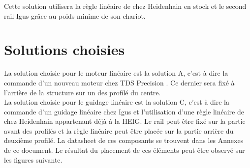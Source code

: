\begin{table}[H]
  \centering
  \caption{Offres pour le guidage}
  \label{tab:OffreGuid2}
\end{table}

Cette solution utilisera la règle linéaire de chez Heidenhain en stock et le second rail Igus grâce au poids minime de son chariot.

\section{Solutions choisies}\label{sec:SolChoix}

La solution choisie pour le moteur linéaire est la solution A, c'est à dire la commande d'un nouveau moteur chez TDS Precision \cite{TDSPrecisionProducts}. Ce dernier
sera fixé à l'arrière de la structure sur un des profilé du centre.\\

La solution choisie pour le guidage linéaire est la solution C, c'est à dire la commande d'un guidage linéaire chez Igus \cite{Igus} et l'utilisation d'une
règle linéaire de chez Heidenhain \cite{Heidenhain} appartenant déjà à la HEIG. Le rail peut être fixé sur la partie avant des profilés et la règle linéaire peut
être placée sur la partie arrière du deuxième profilé. La datasheet de ces composants se trouvent dans les Annexes de ce document. Le résultat du placement de ces
éléments peut être observé sur les figures suivante.

